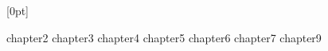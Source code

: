 \documentclass{report}
\begin{document}




  [0pt]
  {\addvspace{1em}}
  {\bfseries\chaptername\ \thecontentslabel\quad}
  {}
  {\bfseries\hfill\contentspage}
\tableofcontents


\newpage

\newpage
{}
{chapter2}
{chapter3}
{chapter4}
{chapter5}
{chapter6}
{chapter7}
{chapter9}
\end{document}
